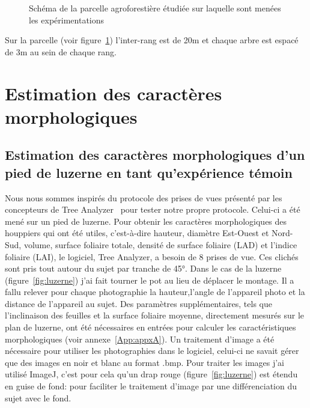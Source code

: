 \documentclass[12pt]{report}
\newcommand\indexp[1]{#1\index{#1}}
\begin{document}
\begin{figure}
  \centering
  \def\svgwidth{\linewidth}
  
  \caption{Schéma de la parcelle agroforestière étudiée sur laquelle sont
  menées les expérimentations\label{fig:parcelle}}
\end{figure}

Sur la parcelle (voir figure~\ref{fig:parcelle}) l'inter-rang est de 20m et chaque arbre est
espacé de 3m au sein de chaque rang.



\section{Estimation des caractères morphologiques}


\subsection{Estimation des caractères morphologiques d'un pied de luzerne en tant qu'expérience témoin}

Nous nous sommes inspirés du protocole des prises de vues présenté par les
concepteurs de \indexp{Tree Analyzer}~\citep{MAR_ref24, MAR_ref25} pour tester notre
propre protocole. Celui-ci a été mené sur un pied de luzerne. Pour 
obtenir les caractères morphologiques des houppiers qui ont été utiles,
c'est-à-dire hauteur, diamètre Est-Ouest et Nord-Sud, volume, surface foliaire
totale, densité de surface foliaire (\indexp{LAD}) et l'indice foliaire (\indexp{LAI}), le
logiciel, Tree Analyzer, a besoin de 8 prises de vue. Ces clichés sont
pris tout autour du sujet par tranche de 45°. Dans le
cas de la luzerne (figure~\ref{fig:luzerne}) j'ai fait tourner le pot au
lieu de déplacer le montage. Il a fallu relever pour chaque photographie la
hauteur,l'angle de l'appareil photo et la distance de l'appareil au sujet. Des
paramètres supplémentaires, tels que l'inclinaison des feuilles et la surface
foliaire moyenne, directement mesurés sur le plan de luzerne, ont été
nécessaires en entrées pour calculer les caractéristiques morphologiques (voir
annexe~\ref{App:appxA}). Un traitement d'image a été nécessaire pour 
utiliser les photographies dans le logiciel, celui-ci ne savait gérer que des
images en noir et blanc au format .bmp. Pour traiter les images j'ai 
utilisé ImageJ\cite{ImageJ_ref39}, c'est pour cela qu'un drap rouge (figure~\ref{fig:luzerne})
est étendu en guise de fond: pour faciliter le traitement d'image par une
différenciation du sujet avec le fond.
\end{document}
